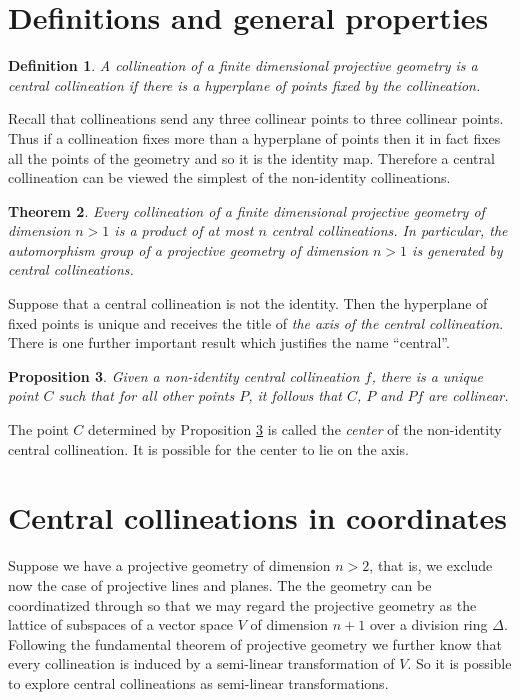 \documentclass[12pt]{article}
\newtheorem{thm}{Theorem}
\newtheorem{prop}[thm]{Proposition}
\newtheorem{defn}[thm]{Definition}
\begin{document}
\section*{Definitions and general properties}

\begin{defn}
A collineation of a finite dimensional projective geometry is a \emph{central collineation} 
if there is a hyperplane of points fixed by the collineation.
\end{defn}

Recall that collineations send any three collinear points to three collinear points.  Thus
if a collineation fixes more than a hyperplane of points then it in fact fixes all the points
of the geometry and so it is the identity map.  Therefore a central collineation can be 
viewed the simplest of the non-identity collineations. 

\begin{thm}
Every collineation of a finite dimensional projective geometry of dimension $n>1$ is
a product of at most $n$ central collineations.  In particular, the automorphism group
of a projective geometry of dimension $n>1$ is generated by central collineations.
\end{thm}

Suppose that a central collineation is not the identity.  Then the hyperplane of fixed points
is unique and receives the title of \emph{the axis of the central collineation}.  There is
one further important result which justifies the name ``central''.

\begin{prop}\label{prop:center}
Given a non-identity central collineation $f$, there is a 
unique point $C$ such that for all other points $P$, it follows that $C$, $P$ and $Pf$ are
collinear.
\end{prop}

The point $C$ determined by Proposition \ref{prop:center} is called the \emph{center}
of the non-identity central collineation.  It is possible for the center to lie on the axis.

\section*{Central collineations in coordinates}

Suppose we have a projective geometry of dimension $n>2$, that is, we exclude now
the case of projective lines and planes.  The the geometry can be coordinatized through
so that we may regard the projective geometry as the lattice
of subspaces of a vector space $V$ of dimension $n+1$ over a division ring $\Delta$.
Following the fundamental theorem of projective geometry we further know that 
every collineation is induced by a semi-linear transformation of $V$.  So it is possible
to explore central collineations as semi-linear transformations.  
\end{document}
